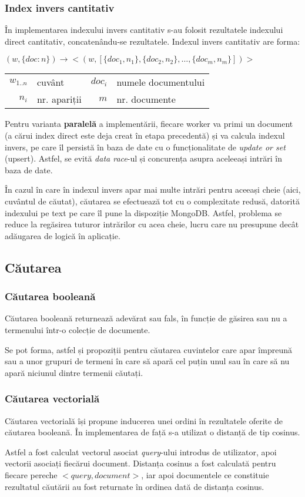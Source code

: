 \documentclass[12pt]{article}
\begin{document}
\subsubsection{Index invers cantitativ}
În implementarea indexului invers cantitativ s-au folosit rezultatele indexului direct cantitativ, concatenându-se rezultatele. Indexul invers cantitativ are forma:
\begin{center}
	$(w,\{doc:n\}) \longrightarrow <(w, [\{doc_{1}, n_{1}\}, \{doc_{2}, n_{2}\}, \dots, \{doc_{m}, n_{m}\}])>$
	\begin{tabular}{r@{: }l r@{: }l}
		$w_{1..n}$ & cuvânt & $doc_{i}$ & numele documentului\\
		$n_{i}$& nr. apariții & $m$ & nr. documente
	\end{tabular}
\end{center}
Pentru varianta \textbf{paralelă} a implementării, fiecare worker va primi un document (a cărui index direct este deja creat în etapa precedentă) și va calcula indexul invers, pe care îl persistă în baza de date cu o funcționalitate de \textit{update or set} (upsert). Astfel, se evită \textit{data race}-ul și concurența asupra aceleeași intrări în baza de date.
\par
În cazul în care în indexul invers apar mai multe intrări pentru aceeași cheie (aici, cuvântul de căutat), căutarea se efectuează tot cu o complexitate redusă, datorită indexului pe text pe care îl pune la dispoziție MongoDB. Astfel, problema se reduce la regăsirea tuturor intrărilor cu acea cheie, lucru care nu presupune decât adăugarea de logică în aplicație.
\subsection{Căutarea}
\subsubsection{Căutarea booleană}
Căutarea booleană returnează adevărat sau fals, în funcție de găsirea sau nu a termenului într-o colecție de documente.
\par
Se pot forma, astfel și propoziții pentru căutarea cuvintelor care apar împreună sau a unor grupuri de termeni în care să apară cel puțin unul sau în care să nu apară niciunul dintre termenii căutați.
\subsubsection{Căutarea vectorială}
Căutarea vectorială își propune inducerea unei ordini în rezultatele oferite de căutarea booleană. În implementarea de față s-a utilizat o distanță de tip cosinus.
\par
Astfel a fost calculat vectorul asociat \textit{query}-ului introdus de utilizator, apoi vectorii asociați fiecărui document. Distanța cosinus a fost calculată pentru fiecare pereche $<query, document>$, iar apoi documentele ce constituie rezultatul căutării au fost returnate în ordinea dată de distanța cosinus.
\end{document}
